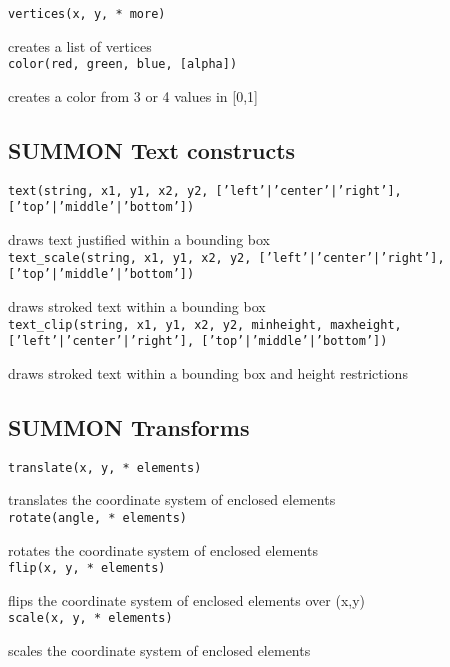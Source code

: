 {\tt vertices(x, y, * more) }

creates a list of vertices \\


{\tt color(red, green, blue, [alpha]) }

creates a color from 3 or 4 values in [0,1] \\


\subsection{SUMMON Text constructs}

{\tt text(string, x1, y1, x2, y2, ['left'|'center'|'right'], ['top'|'middle'|'bottom']) }

draws text justified within a bounding box \\


{\tt text\_scale(string, x1, y1, x2, y2, ['left'|'center'|'right'], ['top'|'middle'|'bottom']) }

draws stroked text within a bounding box \\


{\tt text\_clip(string, x1, y1, x2, y2, minheight, maxheight, ['left'|'center'|'right'], ['top'|'middle'|'bottom']) }

draws stroked text within a bounding box and height restrictions \\


\subsection{SUMMON Transforms}

{\tt translate(x, y, * elements) }

translates the coordinate system of enclosed elements \\


{\tt rotate(angle, * elements) }

rotates the coordinate system of enclosed elements \\


{\tt flip(x, y, * elements) }

flips the coordinate system of enclosed elements over (x,y) \\


{\tt scale(x, y, * elements) }

scales the coordinate system of enclosed elements \\


